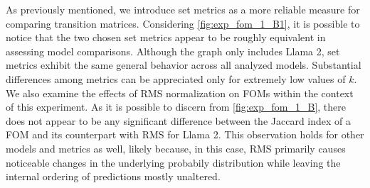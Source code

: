 \begin{table}
    \centering
    \caption[Visualization of the most likely token predicted given common input tokens for various models.]{Visualization of the most likely token predicted by FOM, FOM with RMS and Markov model given common input tokens for Llama 2, Mistral and Phi 3.5.}
    \label{table:exp_fom_predictions}
\end{table}

As previously mentioned, we introduce set metrics as a more reliable measure for comparing transition matrices.
Considering \cref{fig:exp_fom_1_B1}, it is possible to notice that the two chosen set metrics appear to be roughly equivalent in assessing model comparisons.
Although the graph only includes Llama 2, set metrics exhibit the same general behavior across all analyzed models.
Substantial differences among metrics can be appreciated only for extremely low values of $k$.
We also examine the effects of RMS normalization on FOMs within the context of this experiment.
As it is possible to discern from \cref{fig:exp_fom_1_B}, there does not appear to be any significant difference between the Jaccard index of a FOM and its counterpart with RMS for Llama 2.
This observation holds for other models and metrics as well, likely because, in this case, RMS primarily causes noticeable changes in the underlying probabily distribution while leaving the internal ordering of predictions mostly unaltered.

